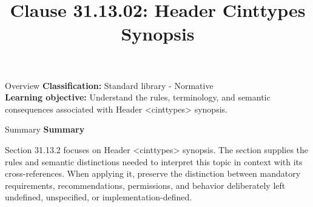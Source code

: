 \documentclass[10pt,letterpaper]{article}
\title{Clause 31.13.02: Header Cinttypes Synopsis}
\author{}
\date{}
\begin{document}
\maketitle
\begin{CornellOverviewBox}{Overview}
\textbf{Classification:} Standard library - Normative\\[2pt]
\textbf{Learning objective:} Understand the rules, terminology, and semantic consequences associated with Header <cinttypes> synopsis.
\end{CornellOverviewBox}\begin{CornellSummaryBox}{Summary}
{\sffamily\bfseries\color{Accent} Summary}\par\vspace{3pt}Section 31.13.2 focuses on Header <cinttypes> synopsis. The section supplies the rules and semantic distinctions needed to interpret this topic in context with its cross-references. When applying it, preserve the distinction between mandatory requirements, recommendations, permissions, and behavior deliberately left undefined, unspecified, or implementation-defined.
\end{CornellSummaryBox}
\end{document}
